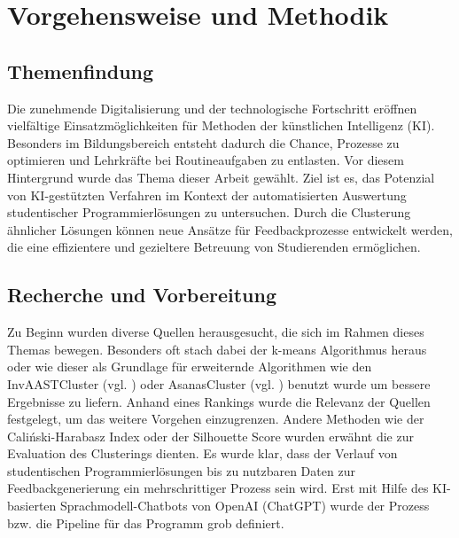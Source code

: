 \chapter{Vorgehensweise und Methodik}

\section{Themenfindung}
Die zunehmende Digitalisierung und der technologische Fortschritt eröffnen vielfältige Einsatzmöglichkeiten für Methoden der künstlichen Intelligenz (KI). Besonders im Bildungsbereich entsteht dadurch die Chance, Prozesse zu optimieren und Lehrkräfte bei Routineaufgaben zu entlasten. Vor diesem Hintergrund wurde das Thema dieser Arbeit gewählt. Ziel ist es, das Potenzial von KI-gestützten Verfahren im Kontext der automatisierten Auswertung studentischer Programmierlösungen zu untersuchen. Durch die Clusterung ähnlicher Lösungen können neue Ansätze für Feedbackprozesse entwickelt werden, die eine effizientere und gezieltere Betreuung von Studierenden ermöglichen.

\section{Recherche und Vorbereitung}
Zu Beginn wurden diverse Quellen herausgesucht, die sich im Rahmen dieses Themas bewegen. Besonders oft stach dabei der k-means Algorithmus heraus oder wie dieser als Grundlage für erweiternde Algorithmen wie den InvAASTCluster (vgl. \cite{Orvalho.28.06.2022}) oder AsanasCluster (vgl. \cite{Paiva.2024}) benutzt wurde um bessere Ergebnisse zu liefern. Anhand eines Rankings wurde die Relevanz der Quellen festgelegt, um das weitere Vorgehen einzugrenzen. Andere Methoden wie der Caliński-Harabasz Index oder der Silhouette Score wurden erwähnt die zur Evaluation des Clusterings dienten. Es wurde klar, dass der Verlauf von studentischen Programmierlösungen bis zu nutzbaren Daten zur Feedbackgenerierung ein mehrschrittiger Prozess sein wird. Erst mit Hilfe des KI-basierten Sprachmodell-Chatbots von OpenAI (ChatGPT) wurde der Prozess bzw. die Pipeline für das Programm grob definiert. 

